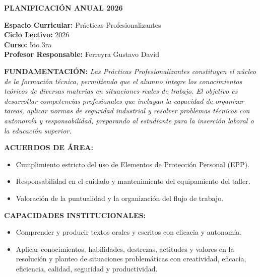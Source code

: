\documentclass[11pt, a4paper]{article}
\begin{document}
\noindent\colorbox{schoolgreen}{\begin{minipage}{\dimexpr\textwidth-2\fboxsep}\centering \textbf{\fontsize{14}{16}\selectfont PLANIFICACIÓN ANUAL 2026}\end{minipage}}

\vspace{1em}
\begin{flushleft}
\textbf{Espacio Curricular:} Prácticas Profesionalizantes \\
\textbf{Ciclo Lectivo:} 2026 \\
\textbf{Curso:} 5to 3ra \\
\textbf{Profesor Responsable:} Ferreyra Gustavo David
\end{flushleft}

\vspace{1em}
\noindent \textbf{FUNDAMENTACIÓN:}
\textit{Las Prácticas Profesionalizantes constituyen el núcleo de la formación técnica, permitiendo que el alumno integre los conocimientos teóricos de diversas materias en situaciones reales de trabajo. El objetivo es desarrollar competencias profesionales que incluyan la capacidad de organizar tareas, aplicar normas de seguridad industrial y resolver problemas técnicos con autonomía y responsabilidad, preparando al estudiante para la inserción laboral o la educación superior.}

\vspace{1em}
\noindent \textbf{ACUERDOS DE ÁREA:}
\begin{itemize}
\item Cumplimiento estricto del uso de Elementos de Protección Personal (EPP).
\item Responsabilidad en el cuidado y mantenimiento del equipamiento del taller.
\item Valoración de la puntualidad y la organización del flujo de trabajo.
\end{itemize}

\vspace{1em}
\noindent \textbf{CAPACIDADES INSTITUCIONALES:}
\begin{itemize}
\item Comprender y producir textos orales y escritos con eficacia y autonomía.
\item Aplicar conocimientos, habilidades, destrezas, actitudes y valores en la resolución y planteo de situaciones problemáticas con creatividad, eficacia, eficiencia, calidad, seguridad y productividad.
\end{itemize}
\end{document}
